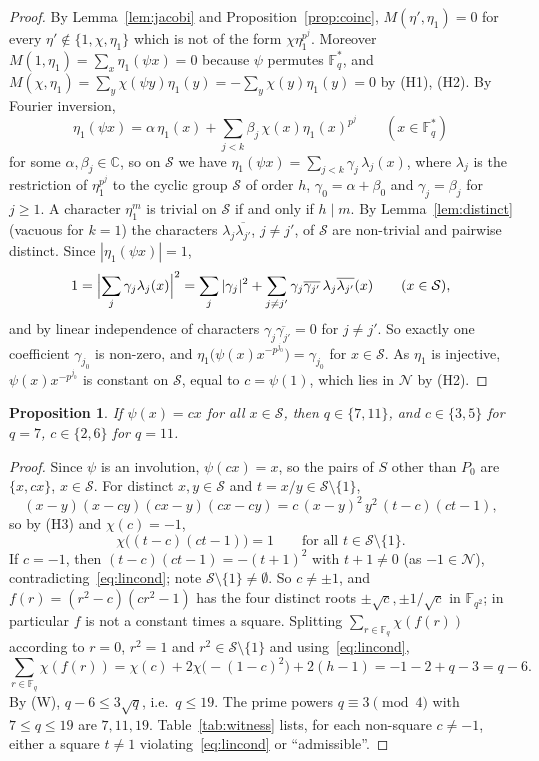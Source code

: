 \documentclass[11pt]{amsart}
\newtheorem{proposition}[theorem]{Proposition}
\theoremstyle{definition}
\theoremstyle{remark}
\numberwithin{equation}{section}
\newcommand{\F}{\mathbb{F}_q}
\newcommand{\Fs}{\mathbb{F}_q^{*}}
\newcommand{\Sq}{\mathcal{S}}
\newcommand{\Ns}{\mathcal{N}}
\newcommand{\C}{\mathbb{C}}
\newcommand{\conj}[1]{\overline{#1}}
\begin{document}
\begin{proof}
By Lemma~\ref{lem:jacobi} and Proposition~\ref{prop:coinc}, $M(\eta',\eta_1)=0$ for every $\eta'\notin\{1,\chi,\eta_1\}$ which is not of
the form $\chi\eta_1^{p^j}$. Moreover $M(1,\eta_1)=\sum_x\eta_1(\psi x)=0$ because $\psi$ permutes $\Fs$, and
$M(\chi,\eta_1)=\sum_y\chi(\psi y)\eta_1(y)=-\sum_y\chi(y)\eta_1(y)=0$ by (H1), (H2). By Fourier inversion,
\[
\eta_1(\psi x)=\alpha\,\eta_1(x)+\sum_{j<k}\beta_j\,\chi(x)\eta_1(x)^{p^j}\qquad(x\in\Fs)
\]
for some $\alpha,\beta_j\in\C$, so on $\Sq$ we have $\eta_1(\psi x)=\sum_{j<k}\gamma_j\,\lambda_j(x)$, where $\lambda_j$ is the
restriction of $\eta_1^{p^j}$ to the cyclic group $\Sq$ of order $h$, $\gamma_0=\alpha+\beta_0$ and $\gamma_j=\beta_j$ for $j\ge1$. A
character $\eta_1^m$ is trivial on $\Sq$ if and only if $h\mid m$. By Lemma~\ref{lem:distinct} (vacuous for $k=1$) the characters
$\lambda_j\conj{\lambda_{j'}}$, $j\ne j'$, of $\Sq$ are non-trivial and pairwise distinct. Since $|\eta_1(\psi x)|=1$,
\[
1=\Bigl|\sum_j\gamma_j\lambda_j(x)\Bigr|^2=\sum_j|\gamma_j|^2+\sum_{j\ne j'}\gamma_j\conj{\gamma_{j'}}\,\lambda_j\conj{\lambda_{j'}}(x)
\qquad(x\in\Sq),
\]
and by linear independence of characters $\gamma_j\conj{\gamma_{j'}}=0$ for $j\ne j'$. So exactly one coefficient $\gamma_{j_0}$ is
non-zero, and $\eta_1\bigl(\psi(x)x^{-p^{j_0}}\bigr)=\gamma_{j_0}$ for $x\in\Sq$. As $\eta_1$ is injective, $\psi(x)x^{-p^{j_0}}$ is
constant on $\Sq$, equal to $c=\psi(1)$, which lies in $\Ns$ by (H2).
\end{proof}

\begin{proposition}\label{prop:lin}
If $\psi(x)=cx$ for all $x\in\Sq$, then $q\in\{7,11\}$, and $c\in\{3,5\}$ for $q=7$, $c\in\{2,6\}$ for $q=11$.
\end{proposition}

\begin{proof}
Since $\psi$ is an involution, $\psi(cx)=x$, so the pairs of $S$ other than $P_0$ are $\{x,cx\}$, $x\in\Sq$. For distinct
$x,y\in\Sq$ and $t=x/y\in\Sq\setminus\{1\}$,
\[
(x-y)(x-cy)(cx-y)(cx-cy)=c\,(x-y)^2\,y^2\,(t-c)(ct-1),
\]
so by (H3) and $\chi(c)=-1$,
\begin{equation}\label{eq:lincond}
\chi\bigl((t-c)(ct-1)\bigr)=1\qquad\text{for all }t\in\Sq\setminus\{1\}.
\end{equation}
If $c=-1$, then $(t-c)(ct-1)=-(t+1)^2$ with $t+1\ne0$ (as $-1\in\Ns$), contradicting~\eqref{eq:lincond}; note
$\Sq\setminus\{1\}\ne\emptyset$. So $c\ne\pm1$, and $f(r)=(r^2-c)(cr^2-1)$ has the four distinct roots $\pm\sqrt c,\pm1/\sqrt c$ in
$\mathbb F_{q^2}$; in particular $f$ is not a constant times a square. Splitting $\sum_{r\in\F}\chi(f(r))$ according to $r=0$,
$r^2=1$ and $r^2\in\Sq\setminus\{1\}$ and using~\eqref{eq:lincond},
\[
\sum_{r\in\F}\chi(f(r))=\chi(c)+2\chi\bigl(-(1-c)^2\bigr)+2(h-1)=-1-2+q-3=q-6 .
\]
By (W), $q-6\le3\sqrt q$, i.e.\ $q\le19$. The prime powers $q\equiv3\pmod 4$ with $7\le q\le19$ are $7,11,19$. Table~\ref{tab:witness}
lists, for each non-square $c\ne-1$, either a square $t\ne1$ violating~\eqref{eq:lincond} or ``admissible''.
\end{proof}
\end{document}
